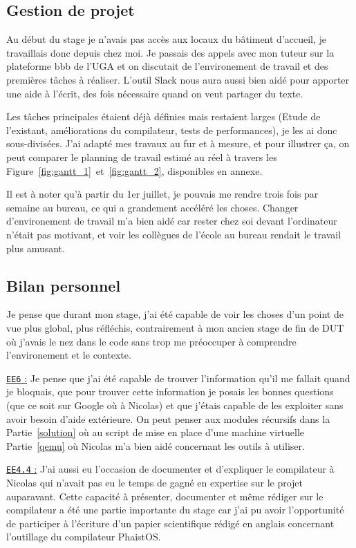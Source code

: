 \subsection{Gestion de projet}

Au début du stage je n'avais pas accès aux locaux du bâtiment d'accueil, je 
travaillais donc depuis chez moi. Je passais des appels avec mon tuteur sur la 
plateforme bbb de l'UGA et on discutait de l'environement de travail et des 
premières tâches à réaliser. L'outil Slack nous aura aussi bien aidé pour 
apporter une aide à l'écrit, des fois nécessaire quand on veut partager du 
texte.

Les tâches principales étaient déjà définies mais restaient larges (Etude de 
l'existant, améliorations du compilateur, tests de performances), je les ai 
donc sous-divisées. J'ai adapté mes travaux au fur et à mesure, et pour 
illustrer ça, on peut comparer le planning de travail estimé au réel à travers 
les Figure~\ref{fig:gantt_1}~et~\ref{fig:gantt_2}, disponibles en annexe.

Il est à noter qu'à partir du 1er juillet, je pouvais me rendre trois fois par 
semaine au bureau, ce qui a grandement accéléré les choses. Changer 
d'environement de travail m'a bien aidé car rester chez soi devant l'ordinateur 
n'était pas motivant, et voir les collègues de l'école au bureau rendait le 
travail plus amusant.

\subsection{Bilan personnel}

Je pense que durant mon stage, j'ai été capable de voir les choses d'un point 
de vue plus global, plus réfléchis, contrairement à mon ancien stage de fin de 
DUT où j'avais le nez dans le code sans trop me préoccuper à comprendre 
l'environement et le contexte. 

\underline{\texttt{EE6} :} Je pense que j'ai été capable de trouver 
l'information qu'il me fallait quand je bloquais, que pour trouver cette 
information je posais les bonnes questions (que ce soit sur Google où à 
Nicolas) et que j'étais capable de les exploiter sans avoir besoin d'aide 
extérieure. On peut penser aux modules récursifs dans la Partie~\ref{solution} 
où au script de mise en place d'une machine virtuelle Partie~\ref{qemu} où 
Nicolas m'a bien aidé concernant les outils à utiliser.

\underline{\texttt{EE4.4} :} J'ai aussi eu l'occasion de documenter et 
d'expliquer le compilateur à Nicolas qui n'avait pas eu le temps de gagné en 
expertise sur le projet auparavant. Cette capacité à présenter, documenter et 
même rédiger sur le compilateur a été une partie importante du stage car j'ai 
pu avoir l'opportunité de participer à l'écriture d'un papier scientifique 
rédigé en anglais concernant l'outillage du compilateur PhaistOS.

